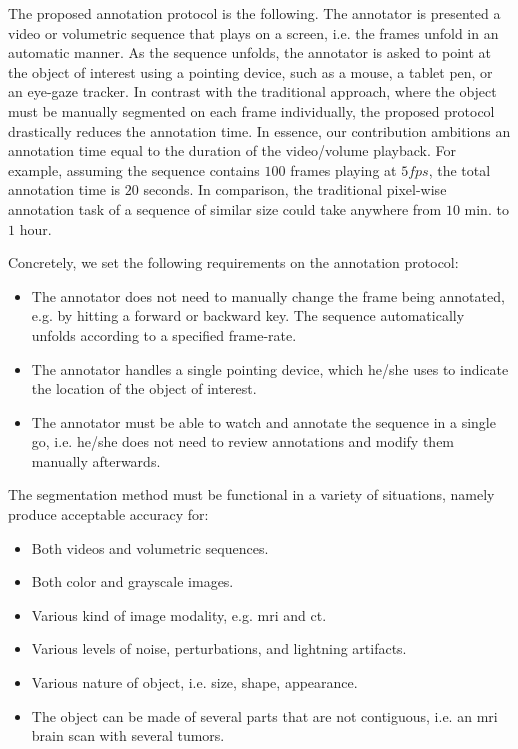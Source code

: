 The proposed annotation protocol is the following.
The annotator is presented a video or volumetric sequence that plays on a screen, i.e. the frames unfold in an automatic manner.
As the sequence unfolds, the annotator is asked to point at the object of interest using a pointing device, such as a mouse, a tablet pen, or an eye-gaze tracker.
In contrast with the traditional approach, where the object must be manually segmented on each frame individually, the proposed protocol drastically reduces the annotation time.
In essence, our contribution ambitions an annotation time equal to the duration of the video/volume playback.
For example, assuming the sequence contains $100$ frames playing at $5fps$, the total annotation time is $20$ seconds.
In comparison, the traditional pixel-wise annotation task of a sequence of similar size could take anywhere from $10$ min. to $1$ hour.

Concretely, we set the following requirements on the annotation protocol:
\begin{itemize}
  \item The annotator does not need to manually change the frame being annotated, e.g. by hitting a forward or backward key. The sequence automatically unfolds according to a specified frame-rate.
  \item The annotator handles a single pointing device, which he/she uses to indicate the location of the object of interest.
  \item The annotator must be able to watch and annotate the sequence in a single go, i.e. he/she does not need to review annotations and modify them manually afterwards.
\end{itemize}

The segmentation method must be functional in a variety of situations, namely produce acceptable accuracy for:
\begin{itemize}
  \item Both videos and volumetric sequences.
  \item Both color and grayscale images.
  \item Various kind of image modality, e.g. \gls{mri} and \gls{ct}.
  \item Various levels of noise, perturbations, and lightning artifacts.
  \item Various nature of object, i.e. size, shape, appearance.
  \item The object can be made of several parts that are not contiguous, i.e. an \gls{mri} brain scan with several tumors.
\end{itemize}


